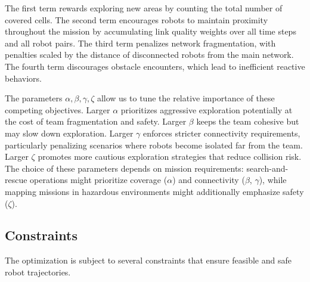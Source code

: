 The first term rewards exploring new areas by counting the total number of covered cells. The second term encourages robots to maintain proximity throughout the mission by accumulating link quality weights over all time steps and all robot pairs. The third term penalizes network fragmentation, with penalties scaled by the distance of disconnected robots from the main network. The fourth term discourages obstacle encounters, which lead to inefficient reactive behaviors.

The parameters $\alpha, \beta, \gamma, \zeta$ allow us to tune the relative importance of these competing objectives. Larger $\alpha$ prioritizes aggressive exploration potentially at the cost of team fragmentation and safety. Larger $\beta$ keeps the team cohesive but may slow down exploration. Larger $\gamma$ enforces stricter connectivity requirements, particularly penalizing scenarios where robots become isolated far from the team. Larger $\zeta$ promotes more cautious exploration strategies that reduce collision risk. The choice of these parameters depends on mission requirements: search-and-rescue operations might prioritize coverage ($\alpha$) and connectivity ($\beta$, $\gamma$), while mapping missions in hazardous environments might additionally emphasize safety ($\zeta$).

\subsection*{Constraints}

The optimization is subject to several constraints that ensure feasible and safe robot trajectories.

